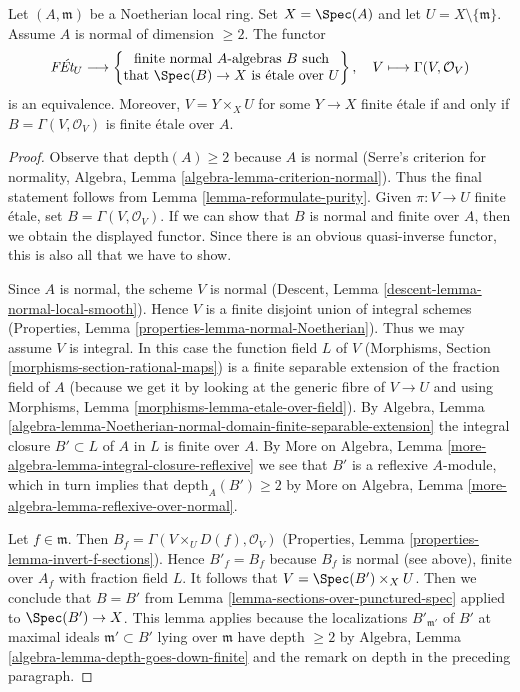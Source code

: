 \begin{lemma}
\label{lemma-reformulate-purity-normal}
Let $(A, \mathfrak m)$ be a Noetherian local ring. Set $X = \Spec(A)$
and let $U = X \setminus \{\mathfrak m\}$. Assume $A$ is normal
of dimension $\geq 2$. The functor
$$
\textit{F\'Et}_U \longrightarrow
\left\{
\begin{matrix}
\text{finite normal }A\text{-algebras }B\text{ such} \\
\text{that }\Spec(B) \to X\text{ is \'etale over }U
\end{matrix}
\right\},
\quad
V \longmapsto \Gamma(V, \mathcal{O}_V)
$$
is an equivalence. Moreover, $V = Y \times_X U$ for some $Y \to X$
finite \'etale if and only if $B = \Gamma(V, \mathcal{O}_V)$
is finite \'etale over $A$.
\end{lemma}

\begin{proof}
Observe that $\text{depth}(A) \geq 2$ because $A$ is normal
(Serre's criterion for normality, Algebra, Lemma
\ref{algebra-lemma-criterion-normal}).
Thus the final statement follows from Lemma \ref{lemma-reformulate-purity}.
Given $\pi : V \to U$ finite \'etale, set $B = \Gamma(V, \mathcal{O}_V)$.
If we can show that $B$ is normal and finite over $A$, then
we obtain the displayed functor. Since there is an obvious
quasi-inverse functor, this is also all that we have to show.

\medskip\noindent
Since $A$ is normal, the scheme $V$ is normal
(Descent, Lemma \ref{descent-lemma-normal-local-smooth}).
Hence $V$ is a finite disjoint union of integral schemes
(Properties, Lemma \ref{properties-lemma-normal-Noetherian}).
Thus we may assume $V$ is integral.
In this case the function field $L$ of $V$
(Morphisms, Section \ref{morphisms-section-rational-maps})
is a finite separable extension of the fraction field of $A$
(because we get it by looking at the generic fibre
of $V \to U$ and using Morphisms, Lemma
\ref{morphisms-lemma-etale-over-field}).
By Algebra, Lemma
\ref{algebra-lemma-Noetherian-normal-domain-finite-separable-extension}
the integral closure $B' \subset L$ of $A$ in $L$ is finite over $A$.
By More on Algebra, Lemma \ref{more-algebra-lemma-integral-closure-reflexive}
we see that $B'$ is a reflexive $A$-module, which in turn implies
that $\text{depth}_A(B') \geq 2$ by
More on Algebra, Lemma \ref{more-algebra-lemma-reflexive-over-normal}.

\medskip\noindent
Let $f \in \mathfrak m$. Then $B_f = \Gamma(V \times_U D(f), \mathcal{O}_V)$
(Properties, Lemma \ref{properties-lemma-invert-f-sections}).
Hence $B'_f = B_f$ because $B_f$ is normal (see above),
finite over $A_f$ with fraction field $L$.
It follows that $V = \Spec(B') \times_X U$.
Then we conclude that $B = B'$ from
Lemma \ref{lemma-sections-over-punctured-spec}
applied to $\Spec(B') \to X$.
This lemma applies because the localizations $B'_{\mathfrak m'}$
of $B'$ at maximal ideals $\mathfrak m' \subset B'$ lying over
$\mathfrak m$ have depth $\geq 2$ by
Algebra, Lemma \ref{algebra-lemma-depth-goes-down-finite}
and the remark on depth in the preceding paragraph.
\end{proof}